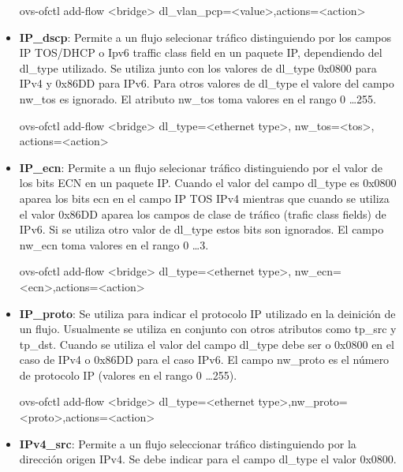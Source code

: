 \begin{itemize}
\begin{center}
ovs-ofctl add-flow <bridge> dl\_vlan\_pcp=<value>,actions=<action>
\end{center}

\item \textbf{IP\_dscp}: Permite a un flujo selecionar tr\'afico distinguiendo por los campos IP TOS/DHCP o Ipv6 traffic class field en un paquete IP, dependiendo del dl\_type utilizado. Se utiliza junto con los valores de dl\_type 0x0800 para IPv4 y 0x86DD para IPv6. Para otros valores de dl\_type el valore del campo nw\_tos es ignorado. El atributo nw\_tos toma valores en el rango 0 \dots 255.

\begin{center}
ovs-ofctl add-flow <bridge> dl\_type=<ethernet type>, nw\_tos=<tos>, actions=<action>
\end{center}

\item \textbf{IP\_ecn}: Permite a un flujo selecionar tr\'afico distinguiendo por el valor de los bits ECN en un paquete IP. Cuando el valor del campo dl\_type es 0x0800 aparea los bits ecn en el campo IP TOS IPv4 mientras que cuando se utiliza el valor 0x86DD aparea los campos de clase de tr\'afico (trafic class fields) de IPv6. Si se utiliza otro valor de dl\_type estos bits son ignorados. El campo nw\_ecn toma valores en el rango 0 \dots 3.

\begin{center}
ovs-ofctl add-flow <bridge> dl\_type=<ethernet type>, nw\_ecn=<ecn>,actions=<action>
\end{center}

\item \textbf{IP\_proto}: Se utiliza para indicar el protocolo IP utilizado en la deinici\'on de un flujo. Usualmente se utiliza en conjunto con otros atributos como tp\_src y tp\_dst. Cuando se utiliza el valor del campo dl\_type debe ser o 0x0800 en el caso de IPv4 o 0x86DD para el caso IPv6. El campo nw\_proto es el n\'umero de protocolo IP (valores en el rango 0 \dots 255).

\begin{center}
ovs-ofctl add-flow <bridge> dl\_type=<ethernet type>,nw\_proto=<proto>,actions=<action>
\end{center}

\item \textbf{IPv4\_src}: Permite a un flujo seleccionar tr\'afico distinguiendo por la dirección origen IPv4. Se debe indicar para el campo dl\_type el valor 0x0800.  


\end{itemize}
